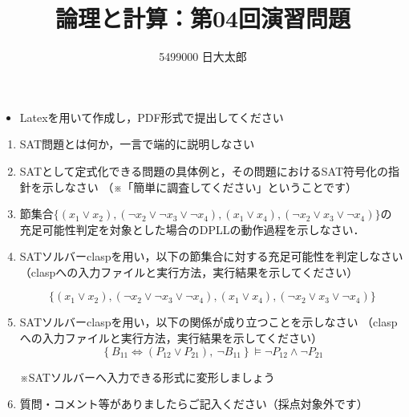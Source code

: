 \documentclass[dvipdfmx]{jsarticle}
\def\NO{04}
\def\LECTURENAME{論理と計算}
\begin{document}
\title{\LECTURENAME{}：第\NO{}回演習問題}

\author{5499000 日大太郎}

\date{}
\maketitle

\begin{itemize}
\item Latexを用いて作成し，PDF形式で提出してください
\end{itemize}


\vspace*{\baselineskip}

\begin{enumerate}\setlength{\itemsep}{\baselineskip}

\item SAT問題とは何か，一言で端的に説明しなさい

\item SATとして定式化できる問題の具体例と，その問題におけるSAT符号化の指針を示しなさい
  （※「簡単に調査してください」ということです）
  
\item 節集合$\{(x_1\lor x_2), (\neg x_2 \lor \neg x_3\lor  \neg x_4), (x_1\lor x_4), (\neg x_2\lor x_3\lor \neg x_4)\}$の
  充足可能性判定を対象とした場合のDPLLの動作過程を示しなさい．

  
\item SATソルバーclaspを用い，以下の節集合に対する充足可能性を判定しなさい
（claspへの入力ファイルと実行方法，実行結果を示してください）
  
\[
\{(x_1\lor x_2), (\neg x_2 \lor \neg x_3\lor  \neg x_4), (x_1\lor x_4), (\neg x_2\lor x_3\lor \neg x_4)\}
\]
  
\item SATソルバーclaspを用い，以下の関係が成り立つことを示しなさい
（claspへの入力ファイルと実行方法，実行結果を示してください）
  \[
  \left\{ B_{11}\Leftrightarrow (P_{12}\lor P_{21}),~\neg B_{11}  \right\}
  \models
  \neg P_{12}\land \neg P_{21}
  \]

  ※SATソルバーへ入力できる形式に変形しましょう


\item 質問・コメント等がありましたらご記入ください（採点対象外です）
  
\end{enumerate}
\end{document}
